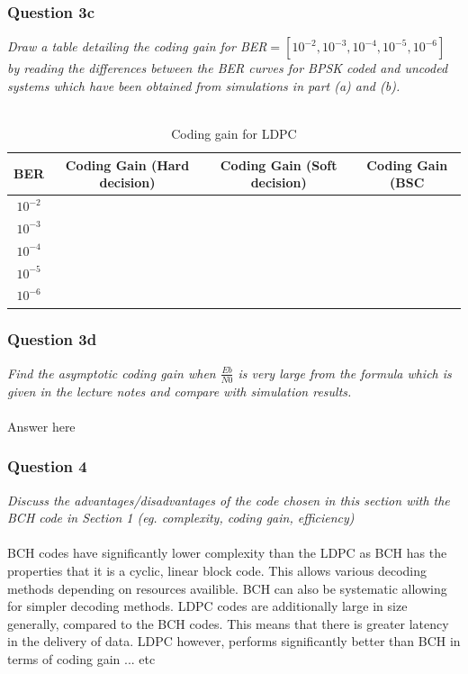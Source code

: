\documentclass[a4paper]{article}
\begin{document}
\subsubsection{Question 3c} \textit{Draw a table detailing the coding gain for BER$= [10^{-2}, 10^{-3}, 10^{-4} , 10^{-5} , 10^{-6} ]$ by reading the differences between the BER curves for BPSK coded and uncoded systems which have been obtained from simulations in part (a) and (b).}\\
\\

\begin{table}[H]
\centering
\begin{tabular}{| c | c | c | c |}
\hline
BER &  Coding Gain (Hard decision) & Coding Gain (Soft decision)  & Coding Gain (BSC\\
\hline
$10^{-2}$ & & & \\
\hline
$10^{-3}$ & & & \\
\hline
$10^{-4}$ & & & \\
\hline
$10^{-5}$ & & & \\
\hline
$10^{-6}$ & & & \\
\hline
\end{tabular}
\caption{Coding gain for LDPC}
\end{table}

\subsubsection{Question 3d} \textit{Find the asymptotic coding gain when $\frac{Eb}{N0}$ is very large from the formula which is given in the lecture notes and compare with simulation results.} \\
\\
Answer here \\

\subsubsection{Question 4} \textit{Discuss the advantages/disadvantages of the code chosen in this section with the BCH code in Section 1 (eg. complexity, coding gain, efficiency)}\\
\\
BCH codes have significantly lower complexity than the LDPC as BCH has the properties that it is a cyclic, linear block code. This allows various decoding methods depending on resources availible. BCH can also be systematic allowing for simpler decoding methods. LDPC codes are additionally large in size generally, compared to the BCH codes. This means that there is greater latency in the delivery of data. LDPC however, performs significantly better than BCH in terms of coding gain ... etc
\end{document}
